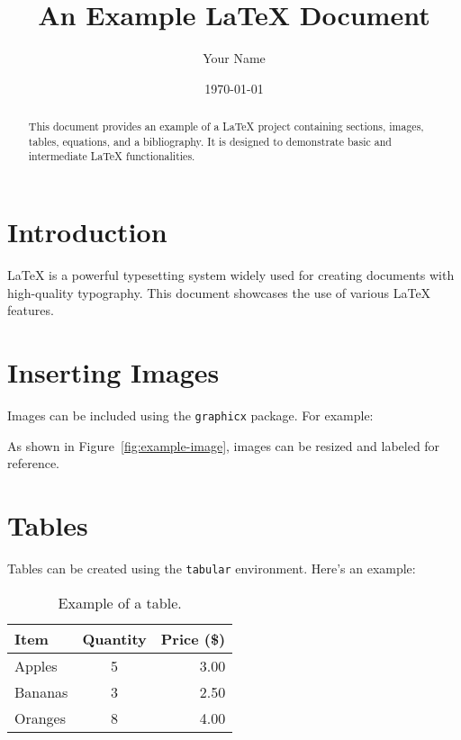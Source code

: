 \documentclass[a4paper,12pt]{article}
\title{An Example LaTeX Document}
\author{Your Name}
\date{\today}
\begin{document}
\maketitle

\begin{abstract}
This document provides an example of a LaTeX project containing sections, images, tables, equations, and a bibliography. It is designed to demonstrate basic and intermediate LaTeX functionalities.
\end{abstract}

\tableofcontents
\newpage

\section{Introduction}
LaTeX is a powerful typesetting system widely used for creating documents with high-quality typography. This document showcases the use of various LaTeX features.

\section{Inserting Images}
Images can be included using the \texttt{graphicx} package. For example:

 

As shown in Figure~\ref{fig:example-image}, images can be resized and labeled for reference.

\section{Tables}
Tables can be created using the \texttt{tabular} environment. Here's an example:

\begin{table}[h!]
    \centering
    \begin{tabular}{|l|c|r|}
    \hline
    \textbf{Item} & \textbf{Quantity} & \textbf{Price (\$)} \\ \hline
    Apples        & 5                 & 3.00               \\ \hline
    Bananas       & 3                 & 2.50               \\ \hline
    Oranges       & 8                 & 4.00               \\ \hline
    \end{tabular}
    \caption{Example of a table.}
    \label{tab:example-table}
\end{table}
\end{document}
